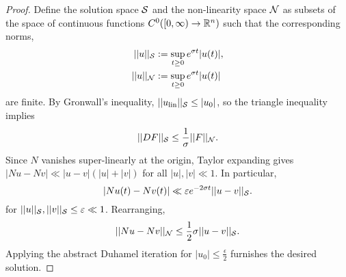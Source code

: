 \begin{proof}
	Define the solution space $\mathcal S$ and the non-linearity space $\mathcal N$ as subsets of the space of continuous functions $C^0 ([0, \infty) \to \mathbb R^n)$ such that the corresponding norms,
		\begin{align*}
			||u||_\mathcal S
				&:= \sup_{t \geq 0} e^{\sigma t} |u(t)|, \\
			||u||_\mathcal N
				&:= \sup_{t \geq 0} e^{\sigma t} |u(t)|
		\end{align*}
	are finite. By Gronwall's inequality, $||u_{\text{lin}}||_\mathcal S \leq |u_0|$, so the triangle inequality implies
		\[ ||DF||_\mathcal S \leq \frac1\sigma ||F||_\mathcal N. \]
	Since $N$ vanishes super-linearly at the origin, Taylor expanding gives $|Nu - Nv| \ll |u - v| (|u| + |v|)$ for all $|u|, |v| \ll 1$. In particular, 
		\[ |N u(t) - Nv(t)| \ll \varepsilon e^{-2\sigma t} ||u - v||_\mathcal S. \]
	for $||u||_\mathcal S, ||v||_\mathcal S \leq \varepsilon \ll 1$. Rearranging, 
		\[ ||Nu - Nv||_\mathcal N \leq \frac12 \sigma ||u - v||_\mathcal S.  \]
	Applying the abstract Duhamel iteration for $|u_0| \leq \tfrac\epsilon2$ furnishes the desired solution. 	
\end{proof}